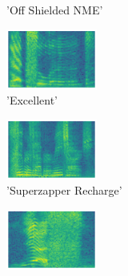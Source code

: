 \begin{figure}[H]
{\begin{subfigure}{0.23\textwidth}
{{        }\hspace*{0.75cm}%
      }%
      \caption*{'Off Shielded NME'}
    \end{subfigure}
    \begin{subfigure}{0.23\textwidth}
      \includegraphics[width=3cm]{sounds/buttons/22.wav-button.png}%
      \caption*{'Excellent'}
    \end{subfigure}
    \begin{subfigure}{0.23\textwidth}
      \includegraphics[width=3cm]{sounds/buttons/23.wav-button.png}%
      \caption*{'Superzapper Recharge'}
    \end{subfigure}
    \begin{subfigure}{0.23\textwidth}
      \includegraphics[width=3cm]{sounds/buttons/24.wav-button.png}%
\end{subfigure}}
\end{figure}

